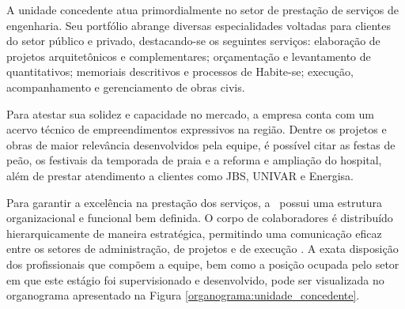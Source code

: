 A unidade concedente atua primordialmente no setor de prestação de serviços de engenharia. Seu portfólio abrange diversas especialidades voltadas para clientes do setor público e privado, destacando-se os seguintes serviços: elaboração de projetos arquitetônicos e complementares; orçamentação e levantamento de quantitativos; memoriais descritivos e processos de Habite-se; execução, acompanhamento e gerenciamento de obras civis.

Para atestar sua solidez e capacidade no mercado, a empresa conta com um acervo técnico de empreendimentos expressivos na região. Dentre os projetos e obras de maior relevância desenvolvidos pela equipe, é possível citar as festas de peão, os festivais da temporada de praia e a reforma e ampliação do hospital, além de prestar atendimento a clientes como JBS, UNIVAR e Energisa.

Para garantir a excelência na prestação dos serviços, a \empresa \ possui uma estrutura organizacional e funcional bem definida. O corpo de colaboradores é distribuído hierarquicamente de maneira estratégica, permitindo uma comunicação eficaz entre os setores de administração, de projetos e de execução . A exata disposição dos profissionais que compõem a equipe, bem como a posição ocupada pelo setor em que este estágio foi supervisionado e desenvolvido, pode ser visualizada no organograma apresentado na Figura \ref{organograma:unidade_concedente}.

